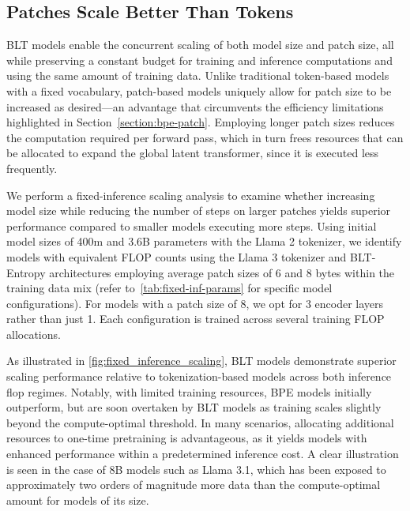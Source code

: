 \subsection{Patches Scale Better Than Tokens} {\textsc BLT} models enable the concurrent scaling of both model size and patch size, all while preserving a constant budget for training and inference computations and using the same amount of training data. Unlike traditional token-based models with a fixed vocabulary, patch-based models uniquely allow for patch size to be increased as desired—an advantage that circumvents the efficiency limitations highlighted in Section~\ref{section:bpe-patch}. Employing longer patch sizes reduces the computation required per forward pass, which in turn frees resources that can be allocated to expand the global latent transformer, since it is executed less frequently.

We perform a fixed-inference scaling analysis to examine whether increasing model size while reducing the number of steps on larger patches yields superior performance compared to smaller models executing more steps. Using initial model sizes of 400m and 3.6B parameters with the Llama 2 tokenizer, we identify models with equivalent FLOP counts using the Llama 3 tokenizer and {\textsc BLT}-Entropy architectures employing average patch sizes of 6 and 8 bytes within the training data mix (refer to~\autoref{tab:fixed-inf-params} for specific model configurations). For models with a patch size of 8, we opt for 3 encoder layers rather than just 1. Each configuration is trained across several training FLOP allocations.

As illustrated in \autoref{fig:fixed_inference_scaling}, {\textsc BLT} models demonstrate superior scaling performance relative to tokenization-based models across both inference flop regimes. Notably, with limited training resources, BPE models initially outperform, but are soon overtaken by {\textsc BLT} models as training scales slightly beyond the compute-optimal threshold. In many scenarios, allocating additional resources to one-time pretraining is advantageous, as it yields models with enhanced performance within a predetermined inference cost. A clear illustration is seen in the case of 8B models such as Llama 3.1, which has been exposed to approximately two orders of magnitude more data than the compute-optimal amount for models of its size.

